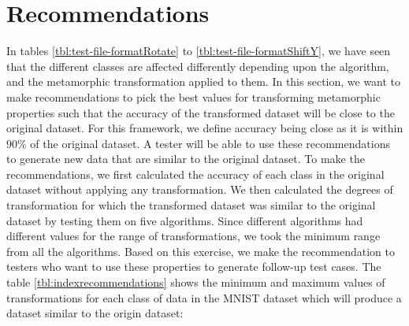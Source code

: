 \section{Recommendations}
In tables \ref{tbl:test-file-formatRotate} to \ref{tbl:test-file-formatShiftY}, we have seen that the different classes are affected differently depending upon the algorithm, and the metamorphic transformation applied to them. In this section, we want to make recommendations to pick the best values for transforming metamorphic properties such that the accuracy of the transformed dataset will be close to the original dataset. For this framework, we define accuracy being close as it is within $90\%$ of the original dataset. A tester will be able to use these recommendations to generate new data that are similar to the original dataset.
To make the recommendations, we first calculated the accuracy of each class in the original dataset without applying any transformation. We then calculated the degrees of transformation for which the transformed dataset was similar to the original dataset by testing them on five algorithms. Since different algorithms had different values for the range of transformations, we took the minimum range from all the algorithms.
Based on this exercise, we make the recommendation to testers who want to use these properties to generate follow-up test cases. The table \ref{tbl:indexrecommendations} shows the minimum and maximum values of transformations for each class of data in the MNIST dataset which will produce a dataset similar to the origin dataset: 

